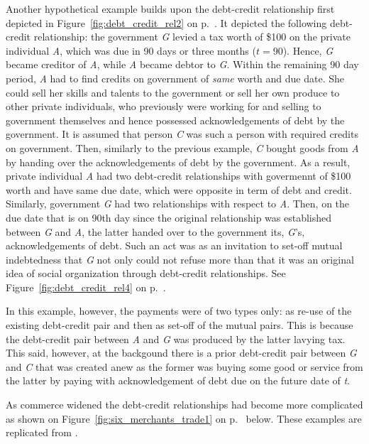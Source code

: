 Another hypothetical example builds upon the debt-credit relationship first depicted in Figure~\ref{fig:debt_credit_rel2} on p.~\pageref{fig:debt_credit_rel2}. It depicted the following debt-credit relationship: the government \textit{G} levied a tax worth of \$100 on the private individual \textit{A}, which was due in 90 days or three months (\(t=90\)). Hence, \textit{G} became creditor of \textit{A}, while \textit{A} became debtor to \textit{G}. Within the remaining 90 day period, \textit{A} had to find credits on government of \textit{same} worth and due date. She could sell her skills and talents to the government or sell her own produce to other private individuals, who previously were working for and selling to government themselves and hence possessed acknowledgements of debt by the government. It is assumed that person \textit{C} was such a person with required credits on government. Then, similarly to the previous example, \textit{C} bought goods from \textit{A} by handing over the acknowledgements of debt by the government. As a result, private individual \textit{A} had two debt-credit relationships with govermennt of \$100 worth and have same due date, which were opposite in term of debt and credit. Similarly, government \textit{G} had two relationships with respect to \textit{A}. Then, on the due date that is on 90th day since the original relationship was established between \textit{G} and \textit{A}, the latter handed over to the government its, \textit{G}'s, acknowledgements of debt. Such an act was as an invitation to set-off mutual indebtedness that \textit{G} not only could not refuse more than that it was an original idea of social organization through debt-credit relationships. See Figure~\ref{fig:debt_credit_rel4} on p.~\pageref{fig:debt_credit_rel4}.

In this example, however, the payments were of two types only: as re-use of the existing debt-credit pair and then as set-off of the mutual pairs. This is because the debt-credit pair between \textit{A} and \textit{G} was produced by the latter lavying tax. This said, however, at the backgound there is a prior debt-credit pair between \textit{G} and \textit{C} that was created anew as the former was buying some good or service from the latter by paying with acknowledgement of debt due on the future date of \textit{t}.

As commerce widened the debt-credit relationships had become more complicated as shown on Figure~\ref{fig:six_merchants_trade1} on p.~\pageref{fig:six_merchants_trade1} below. These examples are replicated from \citep[pp.~402-403]{innes1913}.


